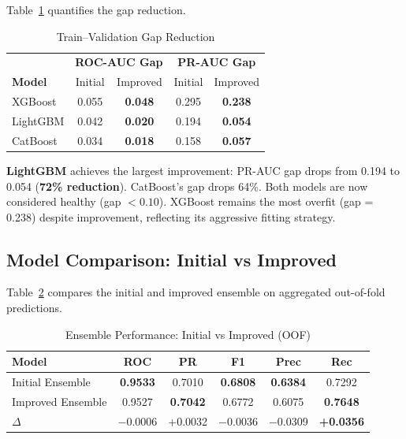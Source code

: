 \documentclass[conference]{IEEEtran}
\begin{document}
Table~\ref{tab:gap_reduction} quantifies the gap reduction.

\begin{table}[t]
\caption{Train--Validation Gap Reduction}
\label{tab:gap_reduction}
\centering
\small
\begin{tabular}{@{}lcccc@{}}
\toprule
& \multicolumn{2}{c}{\textbf{ROC-AUC Gap}} & \multicolumn{2}{c}{\textbf{PR-AUC Gap}} \\
\textbf{Model} & Initial & Improved & Initial & Improved \\
\midrule
XGBoost & 0.055 & \textbf{0.048} & 0.295 & \textbf{0.238} \\
LightGBM & 0.042 & \textbf{0.020} & 0.194 & \textbf{0.054} \\
CatBoost & 0.034 & \textbf{0.018} & 0.158 & \textbf{0.057} \\
\bottomrule
\end{tabular}
\vspace{-1mm}
\end{table}

\textbf{LightGBM} achieves the largest improvement: PR-AUC gap drops from 0.194 to 0.054 (\textbf{72\% reduction}). CatBoost's gap drops 64\%. Both models are now considered healthy (gap $< 0.10$). XGBoost remains the most overfit (gap = 0.238) despite improvement, reflecting its aggressive fitting strategy.

\subsection{Model Comparison: Initial vs Improved}

Table~\ref{tab:comparison} compares the initial and improved ensemble on aggregated out-of-fold predictions.

\begin{table}[t]
\caption{Ensemble Performance: Initial vs Improved (OOF)}
\label{tab:comparison}
\centering
\small
\begin{tabular}{@{}lccccc@{}}
\toprule
\textbf{Model} & \textbf{ROC} & \textbf{PR} & \textbf{F1} & \textbf{Prec} & \textbf{Rec} \\
\midrule
Initial Ensemble & \textbf{0.9533} & 0.7010 & \textbf{0.6808} & \textbf{0.6384} & 0.7292 \\
Improved Ensemble & 0.9527 & \textbf{0.7042} & 0.6772 & 0.6075 & \textbf{0.7648} \\
\midrule
$\Delta$ & $-$0.0006 & +0.0032 & $-$0.0036 & $-$0.0309 & \textbf{+0.0356} \\
\bottomrule
\end{tabular}
\vspace{-1mm}
\end{table}
\end{document}
